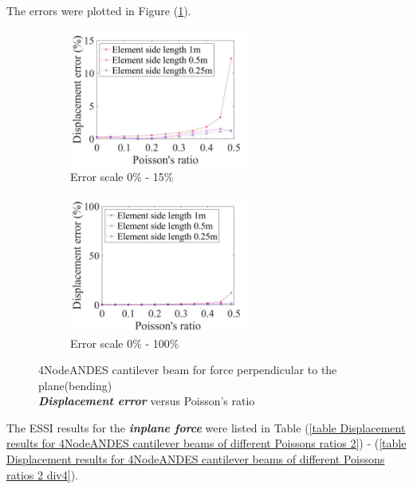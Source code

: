\documentclass[fleqn,11pt,letter]{article}
\begin{document}
The errors were plotted in Figure (\ref{table Displacement error 4NodeANDES cantilever beam for different Poisson ratio}).


\begin{figure}[H]
  \begin{subfigure}{0.5\textwidth}
    \centering
    \includegraphics[width=6cm]{../Figure_files/4NodeANDES/error4andes_beam_dif_poisson_disp_bend_div.jpeg}
    \caption{Error scale 0\% - 15\%}
  \end{subfigure}
  \begin{subfigure}{0.5\textwidth}
    \centering
    \includegraphics[width=6cm]{../Figure_files/4NodeANDES/error4andes_beam_dif_poisson_disp_bend_div100.jpeg}
    \caption{Error scale 0\% - 100\%}
  \end{subfigure}
  \captionsetup{justification=centering,margin=2cm}
  \caption{4NodeANDES cantilever beam for force perpendicular to the plane(bending)\\
      \emph{\textbf{Displacement error}}   versus   Poisson's ratio}
  \label{table Displacement error 4NodeANDES cantilever beam for different Poisson ratio}
\end{figure}






The ESSI results for the \textbf{\emph{inplane force}} were listed in Table (\ref{table Displacement results for 4NodeANDES cantilever beams of different Poissons ratios 2}) - (\ref{table Displacement results for 4NodeANDES cantilever beams of different Poissons ratios 2 div4}).
\end{document}
